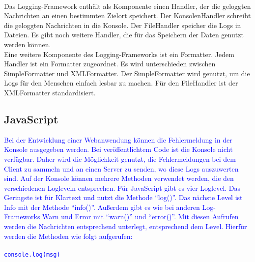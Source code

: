 {    \\
    Das Logging-Framework enthält als Komponente einen Handler, der die geloggten Nachrichten an einen bestimmten Zielort speichert.
    Der KonsolenHandler schreibt die geloggten Nachrichten in die Konsole.
    Der FileHandler speicher die Logs in Dateien.
    Es gibt noch weitere Handler, die für das Speichern der Daten genutzt werden können.
    \\
    Eine weitere Komponente des Logging-Frameworks ist ein Formatter.
    Jedem Handler ist ein Formatter zugeordnet.
    Es wird unterschieden zwischen SimpleFormatter und XMLFormatter.
    Der SimpleFormatter wird genutzt, um die Logs für den Menschen einfach lesbar zu machen.
    Für den FileHandler ist der XMLFormatter standardisiert.
}\autocite{rheinwerk, baeldung, examples}

\subsection{JavaScript}\label{subsec:javascript}
\textcolor{blue}{
    Bei der Entwicklung einer Webanwendung können die Fehlermeldung in der Konsole ausgegeben werden.
    Bei veröffentlichtem Code ist die Konsole nicht verfügbar.
    Daher wird die Möglichkeit genutzt, die Fehlermeldungen bei dem Client zu sammeln und an einen Server zu senden, wo diese Logs auszuwerten sind.
    Auf der Konsole können mehrere Methoden verwendet werden, die den verschiedenen Logleveln entsprechen.
    Für JavaScript gibt es vier Loglevel.
    Das Geringste ist für Klartext und nutzt die Methode \enquote{log()}.
    Das nächste Level ist Info mit der Methode \enquote{info()}.
    Außerdem gibt es wie bei anderen Log-Frameworks Warn und Error mit \enquote{warn()} und \enquote{error()}.
    Mit diesen Aufrufen werden die Nachrichten entsprechend unterlegt, entsprechend dem Level.
    Hierfür werden die Methoden wie folgt aufgerufen:
    \\
    \\
    \hspace*{10mm}
    \texttt{console.log(msg)}
}\autocite{stackify}

